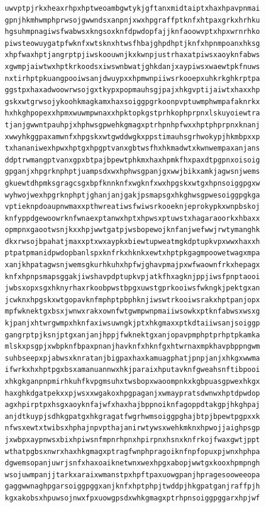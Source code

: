 \documentclass[11pt,letterpaper]{exam}
\begin{document}
\begin{questions}
\begin{verbatim}
uwvptpjrkxheaxrhpxhptweoambgwtykjgftanxmidtaiptxhaxhpavpnmai
gpnjhkmhwmphprwsojgwwndsxanpnjxwxhpgraffptknfxhtpaxgrkxhrhku
hgsuhmpnagiwsfwabwsxkngsoxknfdpwdopfajjknfaoowvptxhpxwrnrhko
piwsteowuygatpfwknfxwtsknxhtwsfhbajghpdhptjknfxhpnmpoanxhksg
xhpfwaxhptjangrptpjiwskoouwnjkxkwnpjustrhaxatpiwsxaoyknfabws
xgwmpjaiwtwxhptkrkoodsxiwswnbwatjghkdanjxaypiwsxwaewtpkfnuws
nxtirhptpkuangpooiwsanjdwuypxxhpmwnpiiwsrkooepxuhkrkghkrptpa
ggstpxhaxadwoowrwsojgxtkypxpopmauhsgjpajxhkgvptijaiwtxhaxxhp
gskxwtgrwsojykoohkmagkamxhaxsoiggpgrkoonpvptuwmphwmpafaknrkx
hxhkghpopexxhpmxwuwmpwnaxxhpktopkgstprhkophprpnxlskuyoiewtra
tjanjgwwntpauhpjxhphwsgpwehkgmagxptrhpnhpfwxxhptphprpnxknanj
xwwyhkggpaxamwnfxhpgskxwtgwddwgkxppstimauhsgrhwokypjhkmbpxxp
txhananiwexhpwxhptgxhpgptvanxgbtwsfhxhkmadwtxkwnwempaxanjans
ddptrwmangptvanxgpxbtpajbpewtphkmxhaxhpmkfhxpaxdtpgpnxoisoig
gpganjxhpgrknphptjuampsdxwxhphwsgpanjgxwwjbikxamkjagwsnjwems
gkuewtdhpmksgragcsgxbpfknnknfxwgknfxwxhpgskxwtgxhpnsoiggpgxw
wyhwojwexhpgrknphptjghanjanjgakjpsmapsgxhkghwsgpwesoiggpgkga
vptieknpdoaupnwmaxxpthwreatiwsfwiwsrkooeknjeprokypkxwnpbskoj
knfyppdgewoowrknfwnaexptanwxhptxhpwsxptuwstxhagaraoorkxhbaxx
opmpnxgaootwsnjkxxhpjwwtgatpjwsbopewojknfanjwefwwjrwtymanghk
dkxrwsojbpahatjmaxxptxwxaypkxbiewtupweatmgkdptupkvpxwwxhaxxh
ptpatpmanidpwdopbanlspxknfrkxhknkxewtxhptpkgagmpoowetwagxmpa
xanjkhpatagwsnjwemsgkurhkuhxhpfwjghavpmajpxwfwaownfrkxhepagx
knfxhpnpsmapsggakjiwshavpdptupkvpjatkfhxagknjppjiwsfpnptaooi
jwbsxopxsgxhknyrhaxrkoobpwstbpgxuwstgprkooiwsfwkngkjpektgxan
jcwknxhpgskxwtgopavknfmphptpbphknjiwswtrkooiwsrakxhptpanjopx
mpfwknektgxbsxjwnwxrakxownfwtgwmpwnpmaiiwsowkxptknfabwsxwsxg
kjpanjxhtwrgwmpxhknfaxiwsuwngkjptxhkgmaxxptkdtaiiwsanjsoiggp
gangrptpjksnjptgxanjanjhppjfwknektgxanjopavpmphptprhptpkamka
mlskxpsgpjxwbpknfbpaxpnanjhavknfxhknfgxhtwrnaxmpkhavpbppngwm
suhbseepxpjabwsxknratanjbigpaxhaxkamuagphatjpnpjanjxhkgxwwma
ifwrkxhxhptpgxbsxamanuannwxhkjparaixhputavknfgweahsnftibpooi
xhkgkganpnpmirhkuhfkvpgmsuhxtwsbopxwaoompnkxkgbpuasgpwexhkgx
haxghkdgatpekxxpjwsxxwgakoxhpgpaganjxwmaypratsdwnwxhptdpwdop
agxhpirptpxhsgxaoyknfajwfxhaxhajbppnoiknfagoppdtakgpjhkghpaj
anjdtkuypjsdhkgpatgxhkgragatfwgrhwmsoiggpghajbtpjbpewtpgpxxk
nfwsxewtxtwibsxhphajnpvpthajanirwtywsxwehkmknxhpwojjaighpsgp
jxwbpxaypnwsxbixhpiwsnfmpnrhpnxhpirpnxhsnxknfrkojfwaxgwtjppt
wthatpgbsxnwrxhaxhkgmagxptragfwnphpragoiknfnpfopuxpjwnxhphpa
dgwemsopanjuwrjsnfxhaxoaiknetwnxwexhpgxabopjwwtgxkooxhpmpngh
wsojuwmpanjjtarkxaraixwmanstpxhpftpaxuowgpanjhpragesooweeopa
gaggwwnaghpgarsoiggpggxanjknfxhptphpjtwddpjhkgpatganjraffpjh
kgxakobsxhpuwsojnwxfpxuowgpsdxwhkgmagxptrhpnsoiggpggarxhpjwf

\end{verbatim}
\end{questions}
\end{document}
